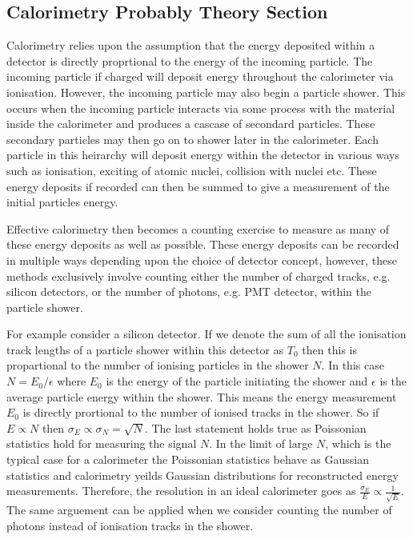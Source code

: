 \subsection{Calorimetry Probably Theory Section}

Calorimetry relies upon the assumption that the energy deposited within a detector is directly proprtional to the energy of the incoming particle.  The incoming particle if charged will deposit energy throughout the calorimeter via ionisation.  However, the incoming particle may also begin a particle shower.  This occurs when the incoming particle interacts via some process with the material inside the calorimeter and produces a cascase of secondard particles.  These secondary particles may then go on to shower later in the calorimeter.  Each particle in this heirarchy will deposit energy within the detector in various ways such as ionisation, exciting of atomic nuclei, collision with nuclei etc.  These energy deposits if recorded can then be summed to give a measurement of the initial particles energy.

Effective calorimetry then becomes a counting exercise to measure as many of these energy deposits as well as possible.  These energy deposits can be recorded in multiple ways depending upon the choice of detector concept, however, these methods exclusively involve counting either the number of charged tracks, e.g. silicon detectors, or the number of photons, e.g. PMT detector, within the particle shower.

For example consider a silicon detector.  If we denote the sum of all the ionisation track lengths of a particle shower within this detector as $T_{0}$ then this is propartional to the number of ionising particles in the shower $N$.  In this case $N = E_{0}/\epsilon$ where $E_{0}$ is the energy of the particle initiating the shower and $\epsilon$ is the average particle energy within the shower.  This means the energy measurement $E_{0}$ is directly prortional to the number of ionised tracks in the shower.  So if $E \propto N$ then $\sigma_{E} \propto \sigma_{N} = \sqrt{N}$.  The last statement holds true as Poissonian statistics hold for measuring the signal $N$.  In the limit of large $N$, which is the typical case for a calorimeter the Poissonian statistics behave as Gaussian statistics and calorimetry yeilds Gaussian distributions for reconstructed energy measurements.  Therefore, the resolution in an ideal calorimeter goes as $\frac{\sigma_{E}}{E} \propto \frac{1}{\sqrt{E}}$.  The same arguement can be applied when we consider counting the number of photons instead of ionisation tracks in the shower.

